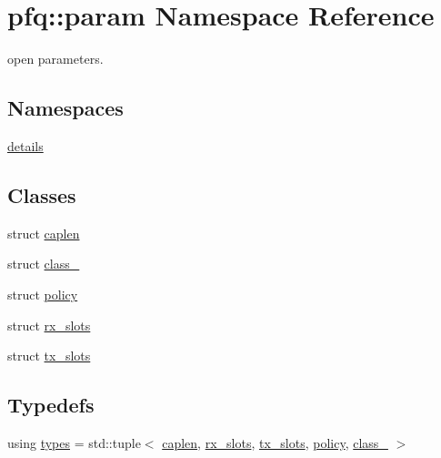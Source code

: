 \hypertarget{namespacepfq_1_1param}{}\section{pfq\+:\+:param Namespace Reference}
\label{namespacepfq_1_1param}


open parameters.  


\subsection*{Namespaces}
\begin{DoxyCompactItemize}
\item 
 \hyperlink{namespacepfq_1_1param_1_1details}{details}
\end{DoxyCompactItemize}
\subsection*{Classes}
\begin{DoxyCompactItemize}
\item 
struct \hyperlink{structpfq_1_1param_1_1caplen}{caplen}
\item 
struct \hyperlink{structpfq_1_1param_1_1class__}{class\+\_\+}
\item 
struct \hyperlink{structpfq_1_1param_1_1policy}{policy}
\item 
struct \hyperlink{structpfq_1_1param_1_1rx__slots}{rx\+\_\+slots}
\item 
struct \hyperlink{structpfq_1_1param_1_1tx__slots}{tx\+\_\+slots}
\end{DoxyCompactItemize}
\subsection*{Typedefs}
\begin{DoxyCompactItemize}
\item 
using \hyperlink{namespacepfq_1_1param_a287394f9fea16ebb76e770334aedd2d5}{types} = std\+::tuple$<$ \hyperlink{structpfq_1_1param_1_1caplen}{caplen}, \hyperlink{structpfq_1_1param_1_1rx__slots}{rx\+\_\+slots}, \hyperlink{structpfq_1_1param_1_1tx__slots}{tx\+\_\+slots}, \hyperlink{structpfq_1_1param_1_1policy}{policy}, \hyperlink{structpfq_1_1param_1_1class__}{class\+\_\+} $>$
\end{DoxyCompactItemize}
